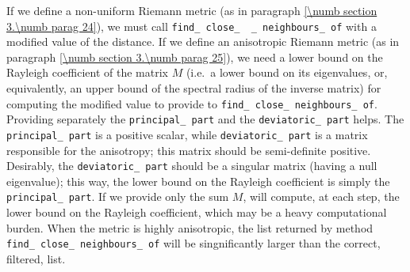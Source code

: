 If we define a non-uniform Riemann metric
(as in paragraph \ref{\numb section 3.\numb parag 24}),
we must call {\small\tt find\_\,close\_\, \_\,neighbours\_\,of} with a modified value of the
distance.
If we define an anisotropic Riemann metric
(as in paragraph \ref{\numb section 3.\numb parag 25}),
we need a lower bound on the Rayleigh coefficient of the matrix $M$ (i.e.\ a lower bound
on its eigenvalues, or, equivalently, an upper bound of the spectral radius of the inverse
matrix) for computing the modified value to provide to {\small\tt find\_\,close\_\,neighbours\_\,of}.
Providing separately the {\small\tt principal\_\,part} and the {\small\tt deviatoric\_\,part} helps.
The {\small\tt principal\_\,part} is a positive scalar, while {\small\tt deviatoric\_\,part} is
a matrix responsible for the anisotropy; this matrix should be semi-definite positive.
Desirably, the {\small\tt deviatoric\_\,part} should be a singular matrix (having a null eigenvalue);
this way, the lower bound on the Rayleigh coefficient is simply the {\small\tt principal\_\,part}.
If we provide only the sum $M$, {\maniFEM} will compute, at each step, the lower bound on the
Rayleigh coefficient, which may be a heavy computational burden.
When the metric is highly anisotropic, the list returned by method
{\small\tt find\_\,close\_\,neighbours\_\,of} will be singnificantly larger than the correct,
filtered, list.

